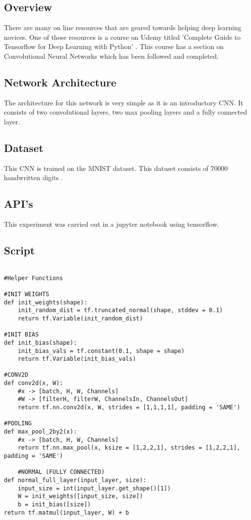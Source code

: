 \subsection*{Overview}
There are many on line resources that are geared towards helping deep learning novices.
One of these resources is a course on Udemy titled 'Complete Guide to Tensorflow for Deep Learning with Python' \textcite{udemy}.
This course has a section on Convolutional Neural Networks which has been followed and completed.

\subsection*{Network Architecture}
The architecture for this network is very simple as it is an introductory CNN.
It consists of two convolutional layers, two max pooling layers and a fully connected layer.

\subsection*{Dataset}
This CNN is trained on the MNIST dataset.
This dataset consists of 70000 handwritten digits \textcite{mnist}.

\subsection*{API's}
This experiment was carried out in a jupyter notebook using tensorflow.

\subsection*{Script}
\begin{lstlisting}

#Helper Functions

#INIT WEIGHTS
def init_weights(shape):
    init_random_dist = tf.truncated_normal(shape, stddev = 0.1)
    return tf.Variable(init_random_dist)

#INIT BIAS
def init_bias(shape):
    init_bias_vals = tf.constant(0.1, shape = shape)
    return tf.Variable(init_bias_vals)

#CONV2D
def conv2d(x, W):
    #x -> [batch, H, W, Channels]
    #W -> [filterH, filterW, ChannelsIn, ChannelsOut]
    return tf.nn.conv2d(x, W, strides = [1,1,1,1], padding = 'SAME')

#POOLING
def max_pool_2by2(x):
    #x -> [batch, H, W, Channels]
    return tf.nn.max_pool(x, ksize = [1,2,2,1], strides = [1,2,2,1], padding = 'SAME')

    #NORMAL (FULLY CONNECTED)
def normal_full_layer(input_layer, size):
    input_size = int(input_layer.get_shape()[1])
    W = init_weights([input_size, size])
    b = init_bias([size])
return tf.matmul(input_layer, W) + b
\end{lstlisting}

